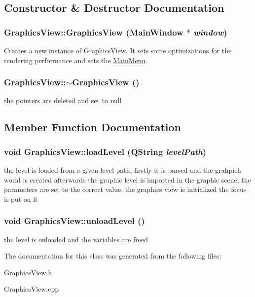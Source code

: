 \subsection{Constructor \& Destructor Documentation}
\hypertarget{classGraphicsView_a434f91cc54ade82b589e384c6cfec165}{
\subsubsection[{GraphicsView}]{\setlength{\rightskip}{0pt plus 5cm}GraphicsView::GraphicsView ({\bf MainWindow} $\ast$ {\em window})}}
\label{classGraphicsView_a434f91cc54ade82b589e384c6cfec165}
Creates a new instance of \hyperlink{classGraphicsView}{GraphicsView}. It sets some optimizations for the rendering performance and sets the \hyperlink{classMainMenu}{MainMenu}. \hypertarget{classGraphicsView_a367eed0f7fa5ab7b3cbc956f0d89d6d6}{
\subsubsection[{$\sim$GraphicsView}]{\setlength{\rightskip}{0pt plus 5cm}GraphicsView::$\sim$GraphicsView ()}}
\label{classGraphicsView_a367eed0f7fa5ab7b3cbc956f0d89d6d6}
the pointers are deleted and set to null 

\subsection{Member Function Documentation}
\hypertarget{classGraphicsView_abe861e21e6239fca804bd7adf9bf5f3f}{
\subsubsection[{loadLevel}]{\setlength{\rightskip}{0pt plus 5cm}void GraphicsView::loadLevel (QString {\em levelPath})}}
\label{classGraphicsView_abe861e21e6239fca804bd7adf9bf5f3f}
the level is loaded from a given level path, firstly it is parsed and the grahpich world is created afterwards the graphic level is imported in the graphic scene, the parameters are set to the correct value, the graphics view is initialized the focus is put on it \hypertarget{classGraphicsView_a3a2d02a72f584202daceec29afa9187e}{
\subsubsection[{unloadLevel}]{\setlength{\rightskip}{0pt plus 5cm}void GraphicsView::unloadLevel ()}}
\label{classGraphicsView_a3a2d02a72f584202daceec29afa9187e}
the level is onloaded and the variables are freed 

The documentation for this class was generated from the following files:\begin{DoxyCompactItemize}
\item 
GraphicsView.h\item 
GraphicsView.cpp\end{DoxyCompactItemize}

